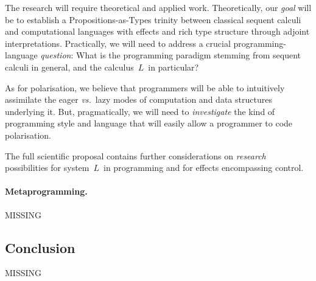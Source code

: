 \documentclass[11pt,twocolumn]{article}
\newcommand{\hl}{\emph}
\newcommand{\vs}{\emph{vs.}}
\newcommand{\SysL}{$L$}%
\begin{document}
The research will require theoretical and applied work.  Theoretically, our
\hl{goal} will be to establish a Propositions-as-Types trinity between
classical sequent calculi and computational languages with effects and rich
type structure through adjoint interpretations.  Practically, we will need to
address a crucial programming-language \hl{question}:  What is the
programming paradigm stemming from sequent calculi in general, and the
calculus~\SysL\ in particular? 

As for polarisation, we believe that programmers will be able to intuitively
assimilate the eager {\vs}~lazy modes of computation and data structures
underlying it.  But, pragmatically, we will need to \hl{investigate} the
kind of programming style and language that will easily allow a programmer to
code polarisation.

The full scientific proposal contains further considerations on \hl{research}
possibilities for system~\SysL\ in programming and for effects encompassing
control.

\paragraph{Metaprogramming.}
\label{MetaprogrammingParagraph}

\mbox{}\newline
{\color{red}MISSING}

\subsection{Conclusion}

{\color{red}MISSING}
\end{document}
